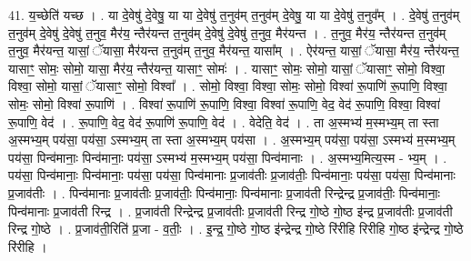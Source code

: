 \documentclass[17pt]{extarticle}
\begin{document}
41. य॒च्छेति॑ यच्छ । . या दे॒वेषु॑ दे॒वेषु॒ या या दे॒वेषु॑ त॒नुव॑म् त॒नुव॑म् दे॒वेषु॒ या या दे॒वेषु॑ त॒नुव᳚म् । . दे॒वेषु॑ त॒नुव॑म् त॒नुव॑म् दे॒वेषु॑ दे॒वेषु॑ त॒नुव॒ मैर॑य॒ न्तैर॑यन्त त॒नुव॑म् दे॒वेषु॑ दे॒वेषु॑ त॒नुव॒ मैर॑यन्त । . त॒नुव॒ मैर॑य॒ न्तैर॑यन्त त॒नुव॑म् त॒नुव॒ मैर॑यन्त॒ यासां॒ ॅयासा॒ मैर॑यन्त त॒नुव॑म् त॒नुव॒ मैर॑यन्त॒ यासा᳚म् । . ऐर॑यन्त॒ यासां॒ ॅयासा॒ मैर॑य॒ न्तैर॑यन्त॒ यासाꣳ॒॒ सोमः॒ सोमो॒ यासा॒ मैर॑य॒ न्तैर॑यन्त॒ यासाꣳ॒॒ सोमः॑ । . यासाꣳ॒॒ सोमः॒ सोमो॒ यासां॒ ॅयासाꣳ॒॒ सोमो॒ विश्वा॒ विश्वा॒ सोमो॒ यासां॒ ॅयासाꣳ॒॒ सोमो॒ विश्वा᳚ । . सोमो॒ विश्वा॒ विश्वा॒ सोमः॒ सोमो॒ विश्वा॑ रू॒पाणि॑ रू॒पाणि॒ विश्वा॒ सोमः॒ सोमो॒ विश्वा॑ रू॒पाणि॑ । . विश्वा॑ रू॒पाणि॑ रू॒पाणि॒ विश्वा॒ विश्वा॑ रू॒पाणि॒ वेद॒ वेद॑ रू॒पाणि॒ विश्वा॒ विश्वा॑ रू॒पाणि॒ वेद॑ । . रू॒पाणि॒ वेद॒ वेद॑ रू॒पाणि॑ रू॒पाणि॒ वेद॑ । . वेदेति॒ वेद॑ । . ता अ॒स्मभ्य॑ म॒स्मभ्य॒म् ता स्ता अ॒स्मभ्य॒म् पय॑सा॒ पय॑सा॒ ऽस्मभ्य॒म् ता स्ता अ॒स्मभ्य॒म् पय॑सा । . अ॒स्मभ्य॒म् पय॑सा॒ पय॑सा॒ ऽस्मभ्य॑ म॒स्मभ्य॒म् पय॑सा॒ पिन्व॑मानाः॒ पिन्व॑मानाः॒ पय॑सा॒ ऽस्मभ्य॑ म॒स्मभ्य॒म् पय॑सा॒ पिन्व॑मानाः । . अ॒स्मभ्य॒मित्य॒स्म - भ्य॒म् । . पय॑सा॒ पिन्व॑मानाः॒ पिन्व॑मानाः॒ पय॑सा॒ पय॑सा॒ पिन्व॑मानाः प्र॒जाव॑तीः प्र॒जाव॑तीः॒ पिन्व॑मानाः॒ पय॑सा॒ पय॑सा॒ पिन्व॑मानाः प्र॒जाव॑तीः । . पिन्व॑मानाः प्र॒जाव॑तीः प्र॒जाव॑तीः॒ पिन्व॑मानाः॒ पिन्व॑मानाः प्र॒जाव॑ती रिन्द्रेन्द्र प्र॒जाव॑तीः॒ पिन्व॑मानाः॒ पिन्व॑मानाः प्र॒जाव॑ती रिन्द्र । . प्र॒जाव॑ती रिन्द्रेन्द्र प्र॒जाव॑तीः प्र॒जाव॑ती रिन्द्र गो॒ष्ठे गो॒ष्ठ इ॑न्द्र प्र॒जाव॑तीः प्र॒जाव॑ती रिन्द्र गो॒ष्ठे । . प्र॒जाव॑ती॒रिति॑ प्र॒जा - व॒तीः॒ । . इ॒न्द्र॒ गो॒ष्ठे गो॒ष्ठ इ॑न्द्रेन्द्र गो॒ष्ठे रि॑रीहि रिरीहि गो॒ष्ठ इ॑न्द्रेन्द्र गो॒ष्ठे रि॑रीहि । \newline
\pagebreak
{}
\end{document}
